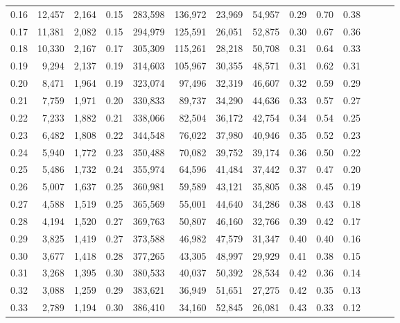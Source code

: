 \begin{tabular}{rrrrrrrrrrrrrr}
0.16 &  12,457 &  2,164 &  0.15 &  283,598 &  136,972 &  23,969 &  54,957 &  0.29 &  0.70 &      0.38 \\
0.17 &  11,381 &  2,082 &  0.15 &  294,979 &  125,591 &  26,051 &  52,875 &  0.30 &  0.67 &      0.36 \\
0.18 &  10,330 &  2,167 &  0.17 &  305,309 &  115,261 &  28,218 &  50,708 &  0.31 &  0.64 &      0.33 \\
0.19 &   9,294 &  2,137 &  0.19 &  314,603 &  105,967 &  30,355 &  48,571 &  0.31 &  0.62 &      0.31 \\
0.20 &   8,471 &  1,964 &  0.19 &  323,074 &   97,496 &  32,319 &  46,607 &  0.32 &  0.59 &      0.29 \\
0.21 &   7,759 &  1,971 &  0.20 &  330,833 &   89,737 &  34,290 &  44,636 &  0.33 &  0.57 &      0.27 \\
0.22 &   7,233 &  1,882 &  0.21 &  338,066 &   82,504 &  36,172 &  42,754 &  0.34 &  0.54 &      0.25 \\
0.23 &   6,482 &  1,808 &  0.22 &  344,548 &   76,022 &  37,980 &  40,946 &  0.35 &  0.52 &      0.23 \\
0.24 &   5,940 &  1,772 &  0.23 &  350,488 &   70,082 &  39,752 &  39,174 &  0.36 &  0.50 &      0.22 \\
0.25 &   5,486 &  1,732 &  0.24 &  355,974 &   64,596 &  41,484 &  37,442 &  0.37 &  0.47 &      0.20 \\
0.26 &   5,007 &  1,637 &  0.25 &  360,981 &   59,589 &  43,121 &  35,805 &  0.38 &  0.45 &      0.19 \\
0.27 &   4,588 &  1,519 &  0.25 &  365,569 &   55,001 &  44,640 &  34,286 &  0.38 &  0.43 &      0.18 \\
0.28 &   4,194 &  1,520 &  0.27 &  369,763 &   50,807 &  46,160 &  32,766 &  0.39 &  0.42 &      0.17 \\
0.29 &   3,825 &  1,419 &  0.27 &  373,588 &   46,982 &  47,579 &  31,347 &  0.40 &  0.40 &      0.16 \\
0.30 &   3,677 &  1,418 &  0.28 &  377,265 &   43,305 &  48,997 &  29,929 &  0.41 &  0.38 &      0.15 \\
0.31 &   3,268 &  1,395 &  0.30 &  380,533 &   40,037 &  50,392 &  28,534 &  0.42 &  0.36 &      0.14 \\
0.32 &   3,088 &  1,259 &  0.29 &  383,621 &   36,949 &  51,651 &  27,275 &  0.42 &  0.35 &      0.13 \\
0.33 &   2,789 &  1,194 &  0.30 &  386,410 &   34,160 &  52,845 &  26,081 &  0.43 &  0.33 &      0.12 \\

\end{tabular}

